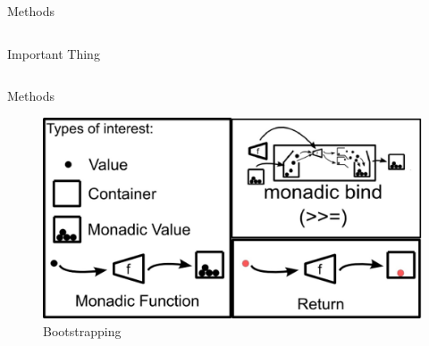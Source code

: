 \documentclass[final]{beamer}
\newlength{\onecolwid}
\newlength{\twocolwid}
\begin{document}
\begin{frame}[t]
\begin{columns}[t]
\begin{column}{\twocolwid}
\begin{columns}[t,totalwidth=\twocolwid]
\begin{column}{\onecolwid}
\begin{block}{Methods}
\end{block}


\end{column} %

\end{columns} %


\begin{alertblock}{Important Thing}


\end{alertblock}


\begin{columns}[t,totalwidth=\twocolwid] %

\begin{column}{\onecolwid} %


\begin{block}{Methods}


\begin{figure}
\includegraphics[width=0.9\linewidth]{img/monad.jpg}
\caption{Bootstrapping}
\end{figure}


\end{block}
\end{column}
\end{columns}
\end{column}
\end{columns}
\end{frame}
\end{document}
